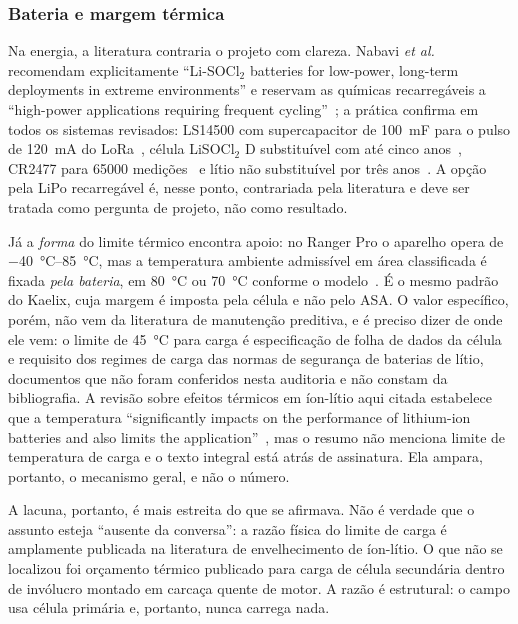 \documentclass[11pt,a4paper]{article}
\begin{document}
\subsubsection{Bateria e margem térmica}

Na energia, a literatura contraria o projeto com clareza. Nabavi \emph{et al.} recomendam
explicitamente ``Li-SOCl$_2$ batteries for low-power, long-term deployments in extreme
environments'' e reservam as químicas recarregáveis a ``high-power applications requiring
frequent cycling''~\cite{nabavi2025}; a prática confirma em todos os sistemas revisados:
LS14500 com supercapacitor de \SI{100}{\milli\farad} para o pulso de
\SI{120}{\milli\ampere} do LoRa~\cite{jakobsen2024}, célula LiSOCl$_2$ D substituível com
até cinco anos~\cite{bentlynevada2025}, CR2477 para \num{65000}
medições~\cite{erbessd2025} e lítio não substituível por três anos~\cite{tractian2022}. A
opção pela LiPo recarregável é, nesse ponto, contrariada pela literatura e deve ser
tratada como pergunta de projeto, não como resultado.

Já a \emph{forma} do limite térmico encontra apoio: no Ranger Pro o aparelho opera de
\SIrange{-40}{85}{\celsius}, mas a temperatura ambiente admissível em área classificada é
fixada \emph{pela bateria}, em \SI{80}{\celsius} ou \SI{70}{\celsius} conforme o
modelo~\cite{bentlynevada2025}. É o mesmo padrão do Kaelix, cuja margem é imposta pela
célula e não pelo ASA. O valor específico, porém, não vem da literatura de manutenção
preditiva, e é preciso dizer de onde ele vem: o limite de \SI{45}{\celsius} para carga é
especificação de folha de dados da célula e requisito dos regimes de carga das normas de
segurança de baterias de lítio, documentos que não foram conferidos nesta auditoria e não
constam da bibliografia. A revisão sobre efeitos térmicos em íon-lítio aqui citada
estabelece que a temperatura ``significantly impacts on the performance of lithium-ion
batteries and also limits the application''~\cite{ma2018}, mas o resumo não menciona limite
de temperatura de carga e o texto integral está atrás de assinatura. Ela ampara, portanto,
o mecanismo geral, e não o número.

A lacuna, portanto, é mais estreita do que se afirmava. Não é verdade que o assunto esteja
``ausente da conversa'': a razão física do limite de carga é amplamente publicada na
literatura de envelhecimento de íon-lítio. O que não se localizou foi orçamento térmico
publicado para carga de célula secundária dentro de invólucro montado em carcaça quente de
motor. A razão é estrutural: o campo usa célula primária e, portanto, nunca carrega nada.
\end{document}
